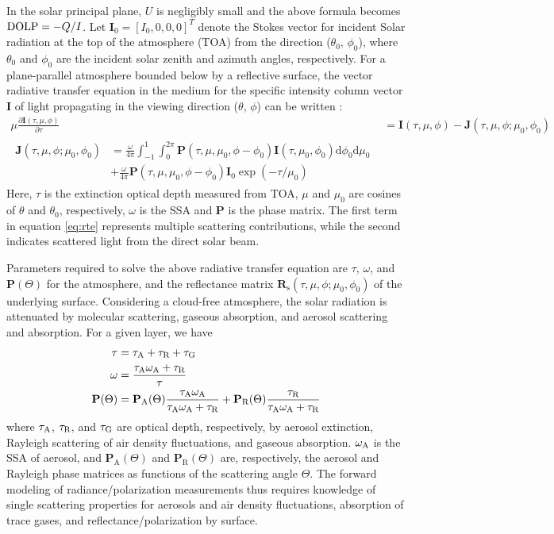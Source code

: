 In the solar principal plane, $U$ is negligibly small and the above formula
becomes $\text{DOLP}=-Q/I$. Let $\mathbf{I}_0=[I_0,0,0,0]^T$ denote the Stokes vector 
for incident Solar radiation at the top of the atmosphere (TOA) from 
the direction ($\theta_0$, $\phi_0$), where $\theta_0$ and $\phi_0$
are the incident solar zenith and azimuth angles, respectively.
For a plane-parallel atmosphere bounded below by a reflective surface, the
vector radiative transfer equation in the medium for the specific intensity
column vector $\mathbf{I}$ of light propagating in the viewing direction 
($\theta$, $\phi$) can be written \citep{Hovenier04, Mishchenko02}:
\begin{align}
\mu \frac{\partial \mathbf{I}(\tau,\mu,\phi)}{\partial \tau} &=
    \mathbf{I}(\tau,\mu,\phi) - \mathbf{J}(\tau,\mu,\phi; \mu_0, \phi_0)
    \label{eq:rte} \\
\begin{split}
\mathbf{J}(\tau,\mu,\phi; \mu_0, \phi_0) &= 
     \frac{\omega}{4\pi}\int_{-1}^{1}\int_{0}^{2\pi} 
     \mathbf{P}(\tau,\mu,\mu_0,\phi-\phi_0) 
     \mathbf{I}(\tau,\mu_0,\phi_0)\text{d}\phi_0\text{d}\mu_0  \\
     & + \frac{\omega}{4\pi}\mathbf{P}(\tau,\mu,\mu_0,\phi-\phi_0)
     \mathbf{I}_0 \exp(-\tau/\mu_0)
\end{split}
\end{align}
Here, $\tau$ is the extinction optical depth measured from TOA, $\mu$ and
$\mu_0$ are cosines of $\theta$ and $\theta_0$, respectively, $\omega$ is the
SSA and $\mathbf{P}$ is the phase matrix. The first term in equation
\eqref{eq:rte} represents multiple scattering contributions, while
the second indicates scattered light from the direct solar beam. 

Parameters required to solve the above radiative transfer equation are $\tau$,
$\omega$, and $\mathbf{P}(\Theta)$ for the atmosphere, and the reflectance
matrix $\mathbf{R}_\text{s}(\tau,\mu,\phi; \mu_0, \phi_0)$ of 
the underlying surface. Considering a cloud-free atmosphere, the solar
radiation is attenuated by molecular scattering, gaseous absorption, and
aerosol scattering and absorption. For a given layer, we have
\begin{align}
\tau   &= \tau_\text{A} + \tau_\text{R} + \tau_\text{G} \\
\omega &= \frac{\tau_\text{A}\omega_\text{A} + \tau_\text{R}}{\tau} \\
\mathbf{P}(\Theta) &=\mathbf{P}_\text{A}(\Theta)
                     \frac{\tau_\text{A}\omega_\text{A}}{\tau_\text{A}\omega_\text{A}+\tau_\text{R}} 
                    + \mathbf{P}_\text{R}(\Theta)
                    \frac{\tau_\text{R}}{\tau_\text{A}\omega_\text{A}+\tau_\text{R}}
\end{align}
where $\tau_\text{A}$, $\tau_\text{R}$, and $\tau_\text{G}$ are optical depth, respectively, by 
aerosol extinction, Rayleigh scattering of air density fluctuations, 
and gaseous absorption. $\omega_\text{A}$ is the SSA of aerosol,  and
$\mathbf{P}_\text{A}(\Theta)$ and $\mathbf{P}_\text{R}(\Theta)$ are, 
respectively, the aerosol and Rayleigh phase matrices as functions of the 
scattering angle $\Theta$. The forward
modeling of radiance/polarization measurements thus requires knowledge of
single scattering properties for aerosols and air density fluctuations,
absorption of trace gases, and reflectance/polarization by surface. 

